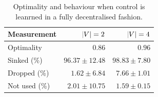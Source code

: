 \begin{table}[ht]
\centering
    \begin{tabular}{lrr}
    \toprule
    Measurement &  $\abs{V} = 2$ & $\abs{V} = 4$ \\
    \midrule
    Optimality & $0.86$ & $0.96$\\
    \midrule
    Sinked (\%) &  $96.37 \pm 12.48$ & $98.83 \pm 7.80$ \\
    Dropped (\%) &  $1.62 \pm  6.84$  & $7.66 \pm 1.01$\\
    Not used (\%) & $2.01 \pm 10.75$ & $1.59 \pm 0.15$ \\
    \bottomrule
    \end{tabular}
    \caption[Optimality and behaviour with fully decentralised learning]{Optimality and behaviour when control is leanrned in a fully decentralised fashion.}
    \label{tab:3c-opti}
\end{table}


    

        
